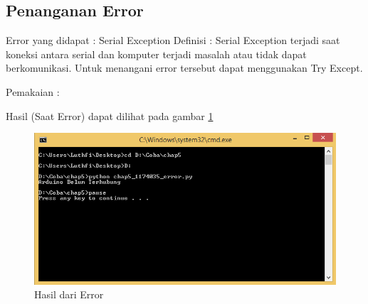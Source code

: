 	\subsection{Penanganan Error}
	Error yang didapat : Serial Exception
	Definisi : Serial Exception terjadi saat koneksi antara serial dan komputer terjadi masalah atau tidak dapat berkomunikasi. Untuk menangani error tersebut dapat menggunakan Try Except.
	
	Pemakaian : 
	
	Hasil (Saat Error) dapat dilihat pada gambar \ref{Error_1174035}
	\begin{figure}[H]
		\includegraphics[width=12cm]{figures/5/1174035/Praktek/Error.png}
		\centering
		\caption{Hasil dari Error}
		\label{Error_1174035}
	\end{figure}
	